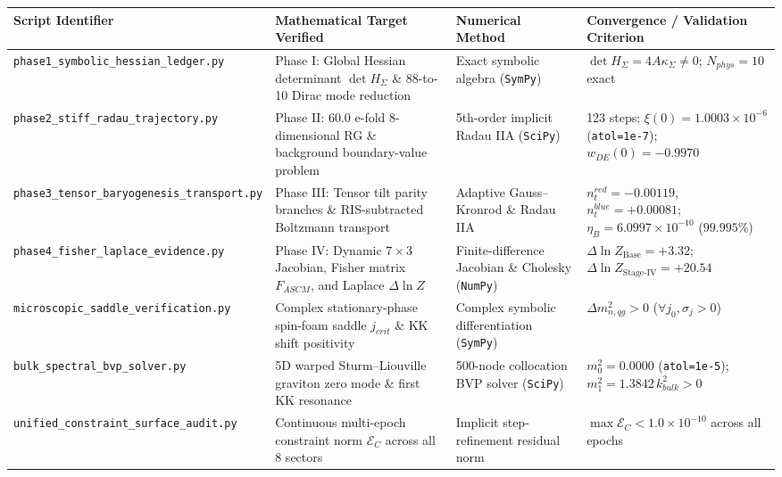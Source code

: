 \documentclass[aps,prd,onecolumn,superscriptaddress,nofootinbib,longbibliography,10pt]{revtex4-2}
\begin{document}
{{  
\begin{center}
\begin{tabular}{|llll|}
\hline

      Script Identifier & Mathematical Target Verified & Numerical Method & Convergence / Validation Criterion
       \\ \hline

    
    
      \texttt{phase1_symbolic_hessian_ledger.py} & Phase I: Global Hessian determinant \(\det H_\Sigma\) \& 88-to-10 Dirac mode reduction & Exact symbolic algebra (\texttt{SymPy}) & \(\det H_\Sigma = 4A\kappa_\Sigma \neq 0\); \(N_{phys} = 10\) exact \\ \hline

      \texttt{phase2_stiff_radau_trajectory.py} & Phase II: 60.0 e-fold 8-dimensional RG \& background boundary-value problem & 5th-order implicit Radau IIA (\texttt{SciPy}) & 123 steps; \(\xi(0) = 1.0003 \times 10^{-6}\) (\texttt{atol=1e-7}); \(w_{DE}(0) = -0.9970\) \\ \hline

      \texttt{phase3_tensor_baryogenesis_transport.py} & Phase III: Tensor tilt parity branches \& RIS-subtracted Boltzmann transport & Adaptive Gauss–Kronrod \& Radau IIA & \(n_t^{red} = -0.00119\), \(n_t^{blue} = +0.00081\); \(\eta_B = 6.0997 \times 10^{-10}\) (\(99.995\%\)) \\ \hline

      \texttt{phase4_fisher_laplace_evidence.py} & Phase IV: Dynamic \(7 \times 3\) Jacobian, Fisher matrix \(F_{ASCM}\), and Laplace \(\Delta\ln Z\) & Finite-difference Jacobian \& Cholesky (\texttt{NumPy}) & \(\Delta\ln Z_{\text{Base}} = +3.32\); \(\Delta\ln Z_{\text{Stage-IV}} = +20.54\) \\ \hline

      \texttt{microscopic_saddle_verification.py} & Complex stationary-phase spin-foam saddle \(j_{crit}\) \& KK shift positivity & Complex symbolic differentiation (\texttt{SymPy}) & \(\Delta m_{n,qg}^2 > 0\) (\(\forall j_0, \sigma_j > 0\)) \\ \hline

      \texttt{bulk_spectral_bvp_solver.py} & 5D warped Sturm–Liouville graviton zero mode \& first KK resonance & 500-node collocation BVP solver (\texttt{SciPy}) & \(m_0^2 = 0.0000\) (\texttt{atol=1e-5}); \(m_1^2 = 1.3842\,k_{bulk}^2 > 0\) \\ \hline

      \texttt{unified_constraint_surface_audit.py} & Continuous multi-epoch constraint norm \(\mathcal{E}_C\) across all 8 sectors & Implicit step-refinement residual norm & \(\max\mathcal{E}_C < 1.0 \times 10^{-10}\) across all epochs \\ \hline



\end{tabular}
\end{center}}}
\end{document}
